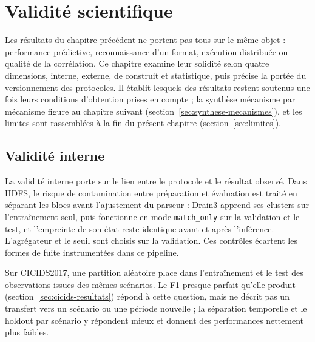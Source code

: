 \chapter{Validité scientifique}
\label{chap:validite}

Les résultats du chapitre précédent ne portent pas tous sur le même objet : performance
prédictive, reconnaissance d'un format, exécution distribuée ou qualité de la corrélation.
Ce chapitre examine leur solidité selon quatre dimensions, interne, externe, de construit et
statistique, puis précise la portée du versionnement des protocoles. Il établit lesquels des
résultats restent soutenus une fois leurs conditions d'obtention prises en compte ; la
synthèse mécanisme par mécanisme figure au chapitre suivant
(section~\ref{sec:synthese-mecanismes}), et les limites sont rassemblées à la fin du présent
chapitre (section~\ref{sec:limites}).

\section{Validité interne}

La validité interne porte sur le lien entre le protocole et le résultat observé. Dans HDFS,
le risque de contamination entre préparation et évaluation est traité en séparant les blocs
avant l'ajustement du parseur : Drain3 apprend ses clusters sur l'entraînement seul, puis
fonctionne en mode \texttt{match\_only} sur la validation et le test, et l'empreinte de son
état reste identique avant et après l'inférence. L'agrégateur et le seuil sont choisis sur la
validation. Ces contrôles écartent les formes de fuite instrumentées dans ce pipeline.

Sur CICIDS2017, une partition aléatoire place dans l'entraînement et le test des
observations issues des mêmes scénarios. Le F1 presque parfait qu'elle produit
(section~\ref{sec:cicids-resultats}) répond à cette question, mais ne décrit pas un transfert vers un scénario ou une période nouvelle ; la
séparation temporelle et le holdout par scénario y répondent mieux et donnent des
performances nettement plus faibles.

